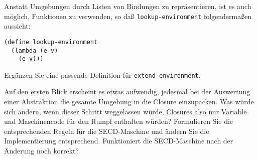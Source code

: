 \begin{aufgabe}
  Anstatt Umgebungen durch Listen von Bindungen zu repräsentieren, ist
  es auch möglich, Funktionen zu verwenden, so daß
  \texttt{lookup-environment} folgendermaßen aussieht:
\begin{verbatim}
(define lookup-environment
  (lambda (e v)
    (e v)))
\end{verbatim}
  Ergänzen Sie eine passende Definition für
  \texttt{extend-environment}.
\end{aufgabe}

\begin{aufgabe}
  Auf den ersten Blick erscheint es etwas aufwendig, jedesmal bei der
  Auswertung einer Abstraktion die gesamte Umgebung in die Closure
  einzupacken.  Was würde sich ändern, wenn dieser Schritt weggelassen
  würde, Closures also nur Variable und Maschinencode für den Rumpf
  enthalten würden?  Formulieren Sie die entsprechenden Regeln für die
  SECD-Maschine und ändern Sie die Implementierung entsprechend.
  Funktioniert die SECD-Maschine nach der Änderung noch korrekt?
\end{aufgabe}


